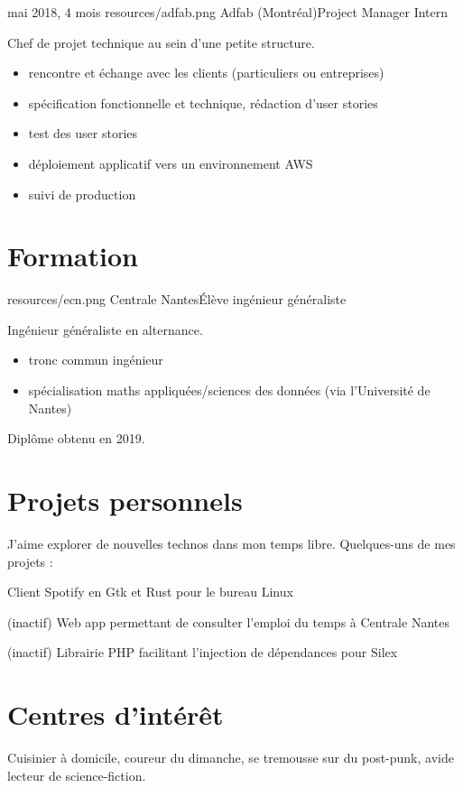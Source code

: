\documentclass{cv}
\begin{document}
\experience
{{mai 2018,  4 mois}}
{resources/adfab.png}
{Adfab (Montréal)}{Project Manager Intern}{

Chef de projet technique au sein d'une petite structure.

\begin{itemize}
	\item rencontre et échange avec les clients (particuliers ou entreprises)
	\item spécification fonctionnelle et technique, rédaction d'user stories
	\item test des user stories
	\item déploiement applicatif vers un environnement AWS
	\item suivi de production
\end{itemize}
}

\pagestyle{withheader}

\section{Formation}

{resources/ecn.png}
{Centrale Nantes}{Élève ingénieur généraliste}{

Ingénieur généraliste en alternance.

\begin{itemize}
	\item tronc commun ingénieur
	\item spécialisation maths appliquées/sciences des données (via l'Université de Nantes)
\end{itemize}

Diplôme obtenu en 2019.
}

\section{Projets personnels}

J'aime explorer de nouvelles technos dans mon temps libre. Quelques-uns de mes projets \href{https://github.com/xou816}{} :

\begin{description}[leftmargin=!,labelwidth=3cm]
	\item[spot {\footnotesize(\faStar{}890)}] Client Spotify en Gtk et Rust pour le bureau Linux
	\item[edt-ecn] (inactif) Web app permettant de consulter l'emploi du temps à Centrale Nantes
	\item[silex-autowiring] (inactif) Librairie PHP facilitant l'injection de dépendances pour Silex
\end{description}

\section{Centres d'intérêt}

Cuisinier à domicile, coureur du dimanche, se tremousse sur du post-punk, avide lecteur de science-fiction.
\end{document}
